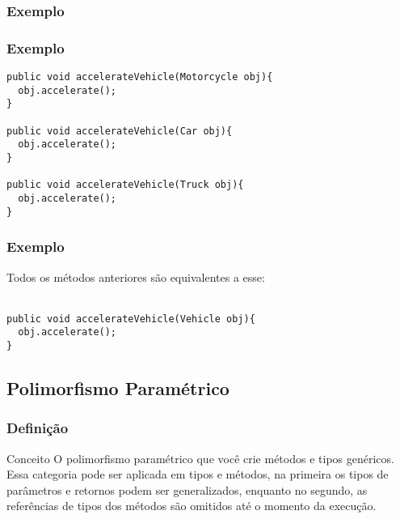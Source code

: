 \begin{frame}
\frametitle{Exemplo}
\centering
{}
\end{frame}

\begin{frame}[fragile]
\frametitle{Exemplo}
\justifying
\begin{lstlisting}
public void accelerateVehicle(Motorcycle obj){
  obj.accelerate();
}

public void accelerateVehicle(Car obj){
  obj.accelerate();
}

public void accelerateVehicle(Truck obj){
  obj.accelerate();
}
\end{lstlisting}
\end{frame}

\begin{frame}[fragile]
\frametitle{Exemplo}
\justifying
\quad Todos os métodos anteriores são equivalentes a esse:
\\~\\
\begin{lstlisting}
public void accelerateVehicle(Vehicle obj){
  obj.accelerate();
}
\end{lstlisting}
\end{frame}


\subsection{Polimorfismo Paramétrico}

\begin{frame}
\frametitle{Definição}
\justifying
\begin{block}{Conceito}
\qquad O polimorfismo paramétrico que você crie métodos e tipos genéricos. 
Essa categoria pode ser aplicada em tipos e métodos, na primeira os tipos de parâmetros e retornos podem ser generalizados, enquanto no segundo, as referências de tipos dos métodos são omitidos até o momento da execução.
\end{block}
\end{frame}

